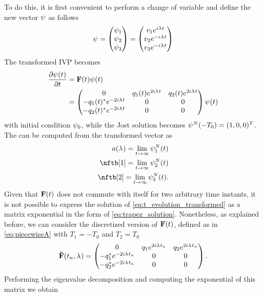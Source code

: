 To do this, it is first convenient to perform a change of variable and define the new vector $\psisol$ as follows
\begin{align}\label{rel}
\psisol=\begin{pmatrix}
      \psisol[1]\\
      \psisol[2] \\
     \psisol[3]
     \end{pmatrix}=\begin{pmatrix}
      \mzssol[1] e^{i\eig t}\\
      \mzssol[2] e^{-i\eig t}\\
      \mzssol[3] e^{-i\eig t}
     \end{pmatrix}
\end{align}
The transformed \ac{IVP} becomes
\begin{align}\label{eq:t_evolution_transformed}\nonumber
\dfrac{\partial \psisol(t)}{\partial t}&= \matr{F}(t) \psisol(t)\\
&=\begin{pmatrix}
       0& \nfld[1](t)e^{2i\eig  t} & \nfld[2](t)e^{2i\eig  t} \\
       -\nfld[1](t)^*e^{-2i\eig  t} &0 & 0 \\
       -\nfld[2](t)^*e^{-2i\eig  t} & 0 & 0
     \end{pmatrix}\psisol(t)
\end{align}
 with initial condition $\psisol[0]$, while the Jost solution becomes  $\tjostnshrt(-T_0) = (1,0,0)^T$.
The \scatcoef{} can be computed from the transformed vector as
\begin{subequations}
\begin{align}
    \nfta = \lim_{t\to\infty} \tjostnshrt[1](t)\\
    \nftb[1] = \lim_{t\to\infty} \tjostnshrt[2](t)\\
    \nftb[2] = \lim_{t\to\infty} \tjostnshrt[3](t).
\end{align}
\end{subequations}
Given that $\matr{F}(t)$ does not commute with itself for two arbitrary time instants, it is not possible to express the solution of
\eqref{eq:t_evolution_transformed} as a matrix exponential in the form of \eqref{eq:trapez_solution}.
Nonetheless, as explained before,
we can consider the discretized version of $\matr{F}(t)$, defined as in \eqref{eq:piecewiseA} with $T_1 = -T_0$ and $T_2 = T_0$
\begin{align}\matr{\tilde{F}}(t_n,\eig)=
     \begin{pmatrix}
      0& \nfld[1]e^{2i\eig  t_n}  & \nfld[2]e^{2i\eig  t_n} \\
       -\nfld[1]^*e^{-2i\eig  t_n} & 0 & 0 \\
       -\nfld[2]^*e^{-2i\eig  t_n}  & 0 & 0
     \end{pmatrix}.
\end{align}
Performing the eigenvalue decomposition and computing the exponential of this matrix we obtain

